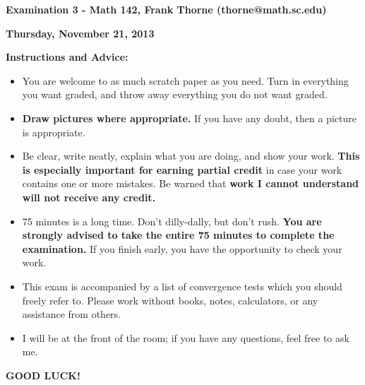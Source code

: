\documentclass[12pt]{article}
\begin{document}
\setlength{\topmargin}{-2mm}





\begin{center}{\bf Examination 3 - Math 142, Frank Thorne (thorne@math.sc.edu)}
\end{center}
\begin{center}
{\bf Thursday, November 21, 2013}
\end{center}

{\bf Instructions and Advice:} 

\begin{itemize}
\item
You are welcome to as much scratch paper as you need. Turn in everything you want graded,
and throw away everything you do not want graded.
\item
{\bf Draw pictures where appropriate.} If you have any doubt, then a picture is appropriate.
\item
Be clear, write neatly, explain what you are doing, and show your work. {\bf This is especially
important for earning partial credit} in case your work contains one or more mistakes.
Be warned that {\bf work I cannot understand will not receive any credit.}
\item
75 minutes is a long time. Don't dilly-dally, but don't rush. {\bf You are strongly advised
to take the entire 75 minutes to complete the examination.} If you finish early, you have the
opportunity to check your work.
\item
This exam is accompanied by a list of convergence tests which you should freely refer to.
Please work without books, notes, calculators, or any assistance from others. 
\item
I will be at the front of the room; if you have
any questions, feel free to ask me. 
\end{itemize}

\begin{center}
{\bf GOOD LUCK!}
\end{center}
\newpage
\end{document}

